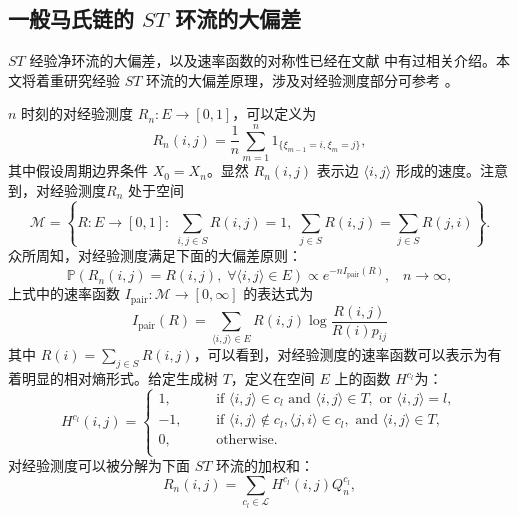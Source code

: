 \subsection{一般马氏链的 $ST$ 环流的大偏差}

$ST$ 经验净环流的大偏差，以及速率函数的对称性已经在文献 \cite{bertini2015flows} 中有过相关介绍。本文将着重研究经验 $ST$ 环流的大偏差原理，涉及对经验测度部分可参考 \cite{den2008large}。

$n$ 时刻的对经验测度 $R_n:E\rightarrow[0,1]$，可以定义为
\begin{equation*}
R_n(i,j) = \frac{1}{n}\sum_{m=1}^n1_{\{\xi_{m-1}=i,\xi_m=j\}},
\end{equation*}
其中假设周期边界条件 $X_0 = X_n$。显然 $R_n(i,j)$ 表示边 $\langle i,j\rangle$ 形成的速度。注意到，对经验测度$R_n$ 处于空间
\begin{equation*}
\mathcal{M} = \left\{R:E\rightarrow[0,1]:\;\sum_{i,j\in S}R(i,j) = 1,\;
\sum_{j\in S}R(i,j)=\sum_{j\in S}R(j,i)\right\}.
\end{equation*}
众所周知，对经验测度满足下面的大偏差原则：
\begin{equation*}
\mathbb{P}(R_n(i,j)=R(i,j),\;\forall\langle i,j\rangle\in E)\propto e^{-nI_{\mathrm{pair}}(R)},\;\;\;n\to\infty,
\end{equation*}
上式中的速率函数 $I_{\mathrm{pair}}:\mathcal{M}\rightarrow[0,\infty]$ 的表达式为
\begin{equation*}
I_{\mathrm{pair}}(R) = \sum_{\langle i,j\rangle\in E}R(i,j)\log\frac{R(i,j)}{R(i)p_{ij}}
\end{equation*}
其中 $R(i)=\sum_{j\in S}R(i,j)$，可以看到，对经验测度的速率函数可以表示为有着明显的相对熵形式。给定生成树 $T$，定义在空间 $E$ 上的函数 $H^{c_l}$为：
\begin{equation*}\label{cycle function2}
H^{c_l}(i,j)
    =\left\{\begin{aligned}
    1, &   && \text{if } \langle i,j\rangle \in c_l \text{ and }\langle i,j\rangle \in T, \text{ or } \langle i,j\rangle=l,\\
    -1,&   && \text{if } \langle i,j\rangle\notin c_l,\langle j,i\rangle \in c_l,\text{ and }\langle i,j\rangle \in T,\\
    0, &   && \text{otherwise}.\\
    \end{aligned}\right.
\end{equation*}
对经验测度可以被分解为下面 $ST$ 环流的加权和：
\begin{equation*}
R_n(i,j) = \sum_{c_l\in\mathcal{L}}H^{c_l}(i,j)Q^{c_l}_n,
\end{equation*}
